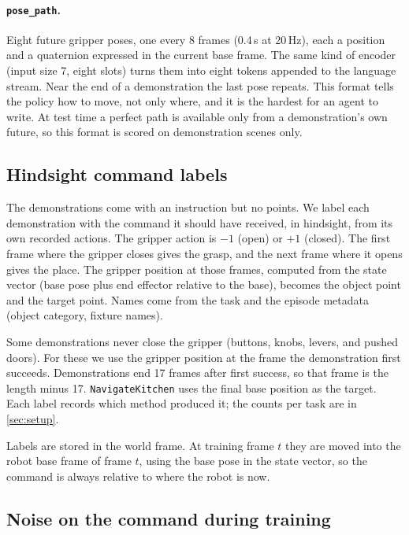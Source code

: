 \paragraph{\texttt{pose\_path}.} Eight future gripper poses, one every 8
frames (0.4\,s at 20\,Hz), each a position and a quaternion expressed in the
current base frame. The same kind of encoder (input size 7, eight slots)
turns them into eight tokens appended to the language stream. Near the end of
a demonstration the last pose repeats. This format tells the policy how to
move, not only where, and it is the hardest for an agent to write. At test
time a perfect path is available only from a demonstration's own future, so
this format is scored on demonstration scenes only. 

\subsection{Hindsight command labels}
\label{sec:labels}

The demonstrations come with an instruction but no points. We label each
demonstration with the command it should have received, in hindsight, from
its own recorded actions. The gripper action is $-1$ (open) or $+1$
(closed). The first frame where the gripper closes gives the grasp, and the
next frame where it opens gives the place. The gripper position at those
frames, computed from the state vector (base pose plus end effector relative
to the base), becomes the object point and the target point. Names come from
the task and the episode metadata (object category, fixture names).

Some demonstrations never close the gripper (buttons, knobs, levers, and
pushed doors). For these we use the gripper position at the frame the
demonstration first succeeds. Demonstrations end 17 frames after first
success, so that frame is the length minus 17. \texttt{NavigateKitchen}
uses the final base position as the target. Each label records which method
produced it; the counts per task are in \cref{sec:setup}.

Labels are stored in the world frame. At training frame $t$ they are moved
into the robot base frame of frame $t$, using the base pose in the state
vector, so the command is always relative to where the robot is now.

\subsection{Noise on the command during training}
\label{sec:noise}

